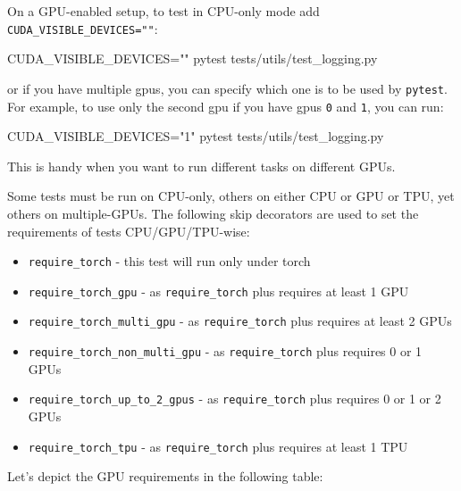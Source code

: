 \documentclass[
]{report}
\newenvironment{Shaded}{\begin{snugshade}}{\end{snugshade}}
\newcommand{\ExtensionTok}[1]{\textcolor[rgb]{0.00,0.23,0.31}{#1}}
\newcommand{\NormalTok}[1]{\textcolor[rgb]{0.00,0.23,0.31}{#1}}
\newcommand{\OperatorTok}[1]{\textcolor[rgb]{0.37,0.37,0.37}{#1}}
\newcommand{\StringTok}[1]{\textcolor[rgb]{0.13,0.47,0.30}{#1}}
\newcommand{\VariableTok}[1]{\textcolor[rgb]{0.07,0.07,0.07}{#1}}
\providecommand{\tightlist}{%
  \setlength{\itemsep}{0pt}\setlength{\parskip}{0pt}}\usepackage{longtable,booktabs,array}
\begin{document}
On a GPU-enabled setup, to test in CPU-only mode add
\texttt{CUDA\_VISIBLE\_DEVICES=""}:

\begin{Shaded}
\begin{Highlighting}[]
\VariableTok{CUDA\_VISIBLE\_DEVICES}\OperatorTok{=}\StringTok{""} \ExtensionTok{pytest}\NormalTok{ tests/utils/test\_logging.py}
\end{Highlighting}
\end{Shaded}

or if you have multiple gpus, you can specify which one is to be used by
\texttt{pytest}. For example, to use only the second gpu if you have
gpus \texttt{0} and \texttt{1}, you can run:

\begin{Shaded}
\begin{Highlighting}[]
\VariableTok{CUDA\_VISIBLE\_DEVICES}\OperatorTok{=}\StringTok{"1"} \ExtensionTok{pytest}\NormalTok{ tests/utils/test\_logging.py}
\end{Highlighting}
\end{Shaded}

This is handy when you want to run different tasks on different GPUs.

Some tests must be run on CPU-only, others on either CPU or GPU or TPU,
yet others on multiple-GPUs. The following skip decorators are used to
set the requirements of tests CPU/GPU/TPU-wise:

\begin{itemize}
\tightlist
\item
  \texttt{require\_torch} - this test will run only under torch
\item
  \texttt{require\_torch\_gpu} - as \texttt{require\_torch} plus
  requires at least 1 GPU
\item
  \texttt{require\_torch\_multi\_gpu} - as \texttt{require\_torch} plus
  requires at least 2 GPUs
\item
  \texttt{require\_torch\_non\_multi\_gpu} - as \texttt{require\_torch}
  plus requires 0 or 1 GPUs
\item
  \texttt{require\_torch\_up\_to\_2\_gpus} - as \texttt{require\_torch}
  plus requires 0 or 1 or 2 GPUs
\item
  \texttt{require\_torch\_tpu} - as \texttt{require\_torch} plus
  requires at least 1 TPU
\end{itemize}

Let's depict the GPU requirements in the following table:
\end{document}
